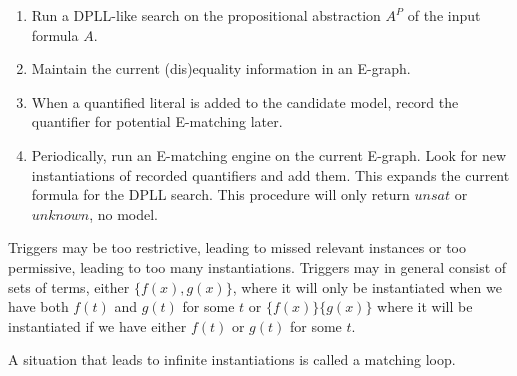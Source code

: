 
\begin{mytitle} \hfill
\begin{enumerate}
    \item Run a DPLL-like search on the propositional abstraction $A^P$ of the input formula $A$.
    \item Maintain the current (dis)equality information in an E-graph.
    \item When a quantified literal is added to the candidate model, record the quantifier for potential E-matching later.
    \item Periodically, run an E-matching engine on the current E-graph. Look for new instantiations of recorded quantifiers and add them. This expands the current formula for the DPLL search. This procedure will only return $unsat$ or $unknown$, no model.
\end{enumerate}
\end{mytitle}
\begin{mytitle} Triggers may be too restrictive, leading to missed relevant instances or too permissive, leading to too many instantiations. Triggers may in general consist of sets of terms, either $\{f(x), g(x)\}$, where it will only be instantiated when we have both $f(t)$ and $g(t)$ for some $t$ or $\{f(x)\}\{g(x)\}$ where it will be instantiated if we have either $f(t)$ or $g(t)$ for some $t$.
\end{mytitle}
\begin{mytitle} A situation that leads to infinite instantiations is called a matching loop.
\end{mytitle}